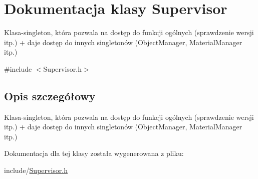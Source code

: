 \hypertarget{class_supervisor}{\section{Dokumentacja klasy Supervisor}
\label{class_supervisor}
}


Klasa-\/singleton, która pozwala na dostęp do funkcji ogólnych (sprawdzenie wersji itp.) + daje dostęp do innych singletonów (Object\-Manager, Material\-Manager itp.)  




{\ttfamily \#include $<$Supervisor.\-h$>$}



\subsection{Opis szczegółowy}
Klasa-\/singleton, która pozwala na dostęp do funkcji ogólnych (sprawdzenie wersji itp.) + daje dostęp do innych singletonów (Object\-Manager, Material\-Manager itp.) 

Dokumentacja dla tej klasy została wygenerowana z pliku\-:\begin{DoxyCompactItemize}
\item 
include/\hyperlink{_supervisor_8h}{Supervisor.\-h}\end{DoxyCompactItemize}
